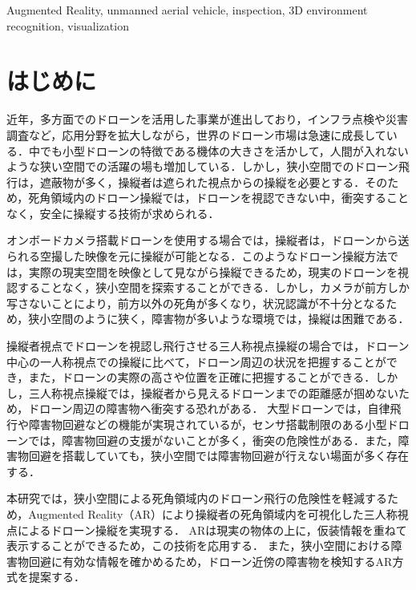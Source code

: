 \documentclass[submit]{ipsj}
\begin{document}
\begin{ekeyword}
Augmented Reality, unmanned aerial vehicle, inspection, 3D environment recognition, visualization
\end{ekeyword}

\maketitle

\section{はじめに}
\label{sec:Introduction}

近年，多方面でのドローンを活用した事業が進出しており，インフラ点検や災害調査など，応用分野を拡大しながら，世界のドローン市場は急速に成長している\cite{article-drone01,article-drone02,article-drone03,book-drone01,article-drone04}．中でも小型ドローンの特徴である機体の大きさを活かして，人間が入れないような狭い空間での活躍の場も増加している．しかし，狭小空間でのドローン飛行は，遮蔽物が多く，操縦者は遮られた視点からの操縦を必要とする．そのため，死角領域内のドローン操縦では，ドローンを視認できない中，衝突することなく，安全に操縦する技術が求められる．
\par
オンボードカメラ搭載ドローンを使用する場合では，操縦者は，ドローンから送られる空撮した映像を元に操縦が可能となる．このようなドローン操縦方法では，実際の現実空間を映像として見ながら操縦できるため，現実のドローンを視認することなく，狭小空間を探索することができる．しかし，カメラが前方しか写さないことにより，前方以外の死角が多くなり，状況認識が不十分となるため\cite{book-drone02}，狭小空間のように狭く，障害物が多いような環境では，操縦は困難である．
\par
操縦者視点でドローンを視認し飛行させる三人称視点操縦の場合では，ドローン中心の一人称視点での操縦に比べて，ドローン周辺の状況を把握することができ，また，ドローンの実際の高さや位置を正確に把握することができる\cite{article-drone04,book-drone02}．しかし，三人称視点操縦では，操縦者から見えるドローンまでの距離感が掴めないため\cite{article-ar01}，ドローン周辺の障害物へ衝突する恐れがある．
大型ドローンでは，自律飛行や障害物回避などの機能が実現されているが，センサ搭載制限のある小型ドローンでは，障害物回避の支援がないことが多く，衝突の危険性がある．また，障害物回避を搭載していても，狭小空間では障害物回避が行えない場面が多く存在する\cite{article-drone05}．
\par
本研究では，狭小空間による死角領域内のドローン飛行の危険性を軽減するため，Augmented Reality（AR）により操縦者の死角領域内を可視化した三人称視点によるドローン操縦を実現する．
ARは現実の物体の上に，仮装情報を重ねて表示することができるため，この技術を応用する\cite{article-ar02}．
また，狭小空間における障害物回避に有効な情報を確かめるため，ドローン近傍の障害物を検知するAR方式を提案する．
\end{document}
